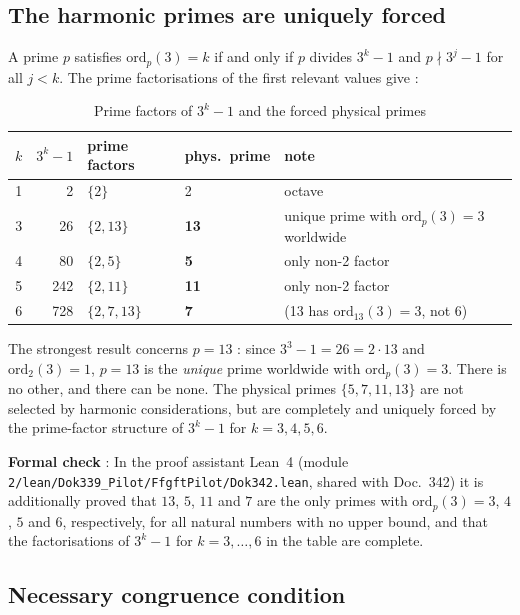 \subsection{The harmonic primes are uniquely forced}

A prime $p$ satisfies $\mathrm{ord}_p(3) = k$ if and only if $p$ divides
$3^k - 1$ and $p \nmid 3^j - 1$ for all $j < k$.
The prime factorisations of the first relevant values give \BM:

\begin{table}[H]
\centering
\caption{Prime factors of $3^k - 1$ and the forced physical primes}
\begin{tabular}{rrlll}
\toprule
$k$ & $3^k - 1$ & prime factors & phys.\ prime & note \\
\midrule
1 & 2 & $\{2\}$ & 2 & octave \\
3 & 26 & $\{2, 13\}$ & \textbf{13} & unique prime with $\mathrm{ord}_p(3)=3$ worldwide \\
4 & 80 & $\{2, 5\}$ & \textbf{5} & only non-2 factor \\
5 & 242 & $\{2, 11\}$ & \textbf{11} & only non-2 factor \\
6 & 728 & $\{2, 7, 13\}$ & \textbf{7} & (13 has $\mathrm{ord}_{13}(3)=3$, not 6) \\
\bottomrule
\end{tabular}
\end{table}

The strongest result concerns $p = 13$ \BM: since $3^3 - 1 = 26 = 2 \cdot 13$
and $\mathrm{ord}_2(3) = 1$, $p = 13$ is the \emph{unique} prime worldwide with
$\mathrm{ord}_p(3) = 3$. There is no other, and there can be none. The physical
primes $\{5, 7, 11, 13\}$ are not selected by harmonic considerations, but are
completely and uniquely forced by the prime-factor structure of $3^k - 1$
for $k = 3, 4, 5, 6$.

\noindent\textbf{Formal check} \LM: In the proof assistant Lean~4 (module
\texttt{2/\allowbreak lean/\allowbreak Dok339\_Pilot/\allowbreak FfgftPilot/\allowbreak Dok342.lean}, shared with Doc.~342) it
is additionally proved that $13$, $5$, $11$ and $7$ are the only primes with
$\mathrm{ord}_p(3)=3$, $4$, $5$ and $6$, respectively, for all natural numbers
with no upper bound, and that the factorisations of $3^k-1$ for $k=3,\dots,6$
in the table are complete.

\subsection{Necessary congruence condition}

